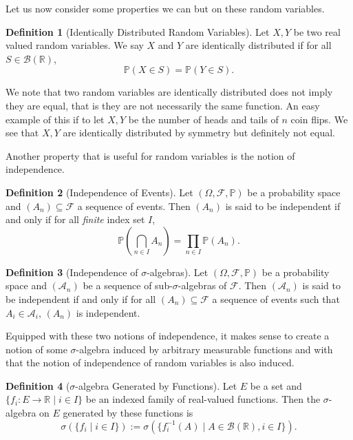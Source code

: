 \documentclass[
]{article}
\theoremstyle{definition}
\newtheorem{definition}{Definition}[section]
\begin{document}
Let us now consider some properties we can but on these random
variables.

\begin{definition}[Identically Distributed Random Variables]
  Let \(X, Y\) be two real valued random variables. We say \(X\) and \(Y\) are 
  identically distributed if for all \(S \in \mathcal{B}(\mathbb{R})\), 
  \[\mathbb{P}(X \in S) = \mathbb{P}(Y \in S).\]
\end{definition}

We note that two random variables are identically distributed does not
imply they are equal, that is they are not necessarily the same
function. An easy example of this if to let \(X, Y\) be the number of
heads and tails of \(n\) coin flips. We see that \(X, Y\) are
identically distributed by symmetry but definitely not equal.

Another property that is useful for random variables is the notion of
independence.

\begin{definition}[Independence of Events]
  Let \((\Omega, \mathcal{F}, \mathbb{P})\) be a probability space and 
  \((A_n) \subseteq \mathcal{F}\) a sequence of events. Then \((A_n)\) is said 
  to be independent if and only if for all \textit{finite} index set \(I\),
  \[\mathbb{P}\left(\bigcap_{n \in I} A_n \right) 
    = \prod_{n \in I} \mathbb{P}(A_n).\] 
\end{definition}

\begin{definition}[Independence of \(\sigma\)-algebras]
  Let \((\Omega, \mathcal{F}, \mathbb{P})\) be a probability space and 
  \((\mathcal{A}_n)\) be a sequence of sub-\(\sigma\)-algebras of 
  \(\mathcal{F}\). Then \((\mathcal{A}_n)\) is said to be independent if and 
  only if for all \((A_n) \subseteq \mathcal{F}\) a sequence of events such that 
  \(A_i \in \mathcal{A}_i\), \((A_n)\) is independent.
\end{definition}

Equipped with these two notions of independence, it makes sense to
create a notion of some \(\sigma\)-algebra induced by arbitrary
measurable functions and with that the notion of independence of random
variables is also induced.

\begin{definition}[\(\sigma\)-algebra Generated by Functions]
  Let \(E\) be a set and \(\{f_i : E \to \mathbb{R} \mid i \in I\}\) be an 
  indexed family of real-valued functions. Then the \(\sigma\)-algebra on \(E\) 
  generated by these functions is 
  \[
    \sigma(\{f_i \mid i \in I\}) := 
    \sigma(\{f_i^{-1}(A) \mid A \in \mathcal{B}(\mathbb{R}), i \in I\}).  
  \]
\end{definition}
\end{document}
